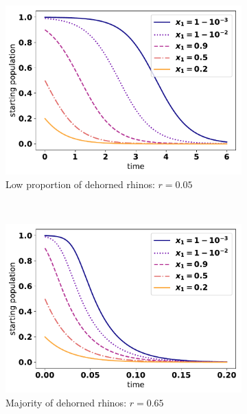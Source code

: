 \documentclass[10pt]{article}
\begin{document}
\begin{figure}[!htbp]
    \centering
    \begin{subfigure}{.3\textwidth}
    \includegraphics[width=\textwidth]{images/IndiscriminateESS-low-r.pdf}
    \caption{Low proportion of dehorned rhinos: \(r=0.05\)}
    \end{subfigure}%
    ~
    \begin{subfigure}{.3\textwidth}
    \includegraphics[width=\textwidth]{images/IndiscriminateESS.pdf}
    \caption{Majority of dehorned rhinos: \(r=0.65\)}
    \end{subfigure}%
    ~
    \begin{subfigure}{.3\textwidth}

\end{subfigure}
\end{figure}
\end{document}
